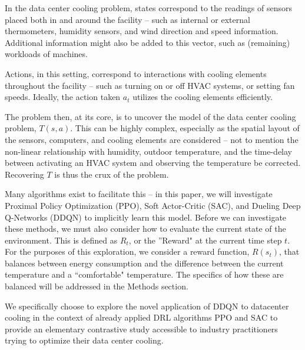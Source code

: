 \documentclass[12pt]{article}
\begin{document}
In the data center cooling problem, states correspond to the readings of sensors placed both in and around the facility -- such as internal or external thermometers, humidity sensors, and wind direction and speed information. Additional information might also be added to this vector, such as (remaining) workloads of machines. 

Actions, in this setting, correspond to interactions with cooling elements throughout the facility -- such as turning on or off HVAC systems, or setting fan speeds. Ideally, the action taken $a_t$ utilizes the cooling elements efficiently.

The problem then, at its core, is to uncover the model of the data center cooling problem, $T(s, a)$. This can be highly complex, especially as the spatial layout of the sensors, computers, and cooling elements are considered -- not to mention the non-linear relationship with humidity, outdoor temperature, and the time-delay between activating an HVAC system and observing the temperature be corrected. Recovering $T$ is thus the crux of the problem. 

Many algorithms exist to facilitate this -- in this paper, we will investigate Proximal Policy Optimization (PPO), Soft Actor-Critic (SAC), and Dueling Deep Q-Networks (DDQN) to implicitly learn this model. Before we can investigate these methods, we must also consider how to evaluate the current state of the environment. This is defined as $R_t$, or the ''Reward" at the current time step $t$. For the purposes of this exploration, we consider a reward function, $R(s_t)$, that balances between energy consumption and the difference between the current temperature and a ``comfortable" temperature. The specifics of how these are balanced will be addressed in the Methods section. 

We specifically choose to explore the novel application of DDQN to datacenter cooling in the context of already applied DRL algorithms PPO and SAC to provide an elementary contrastive study accessible to industry practitioners trying to optimize their data center cooling.

\end{document}
